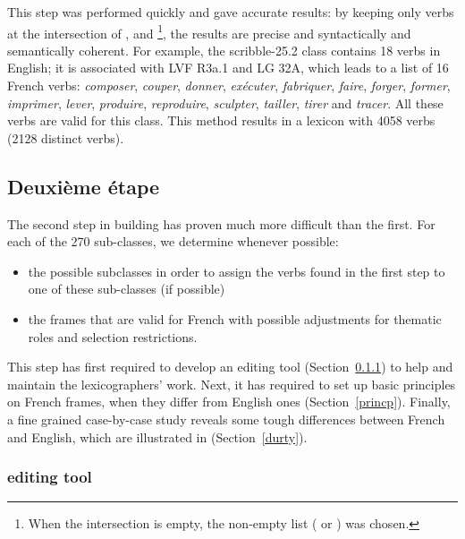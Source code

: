 This step was performed quickly and gave accurate results: by keeping only
verbs at the intersection of \Ltrad{}, \Clvf{} and \Clg{}\footnote{When the
intersection is empty, the non-empty list (\Clvf{} or \Clg{}) was chosen.}, the
results are precise and syntactically and semantically coherent. For example,
the {\color{blue}scribble-25.2} class contains 18 verbs in English; it is
associated with LVF {\color{red}R3a.1} and LG {\color{green}32A},  which leads to a
list of 16 French verbs: \emph{composer}, \emph{couper}, \emph{donner},
\emph{exécuter}, \emph{fabriquer}, \emph{faire}, \emph{forger}, \emph{former},
\emph{imprimer}, \emph{lever}, \emph{produire}, \emph{reproduire},
\emph{sculpter}, \emph{tailler}, \emph{tirer} and \emph{tracer}. All these
verbs are valid for this class.  This method results in a lexicon with 4058
verbs (2128 distinct verbs).



\subsection{Deuxième étape}\label{second}

The second step in building \verbenet{} has proven much more difficult than the
first. For each of the 270 \Cf{} sub-classes, we determine whenever possible:

\begin{itemize}

    \item the possible subclasses in order to assign the verbs found in the
    first step to one of these sub-classes (if possible)

    \item the frames that are valid for French with possible adjustments for
    thematic roles and selection restrictions.

\end{itemize}

This step has first required to develop an editing tool
(Section~\ref{toolquentin}) to help and maintain the lexicographers' work.
Next, it has required to set up basic principles on French frames, when they
differ from English ones (Section~\ref{princp}). Finally, a fine grained
case-by-case study reveals some tough differences between French and English,
which are illustrated in (Section~\ref{durty}).


\subsubsection{\verbenet{} editing tool}\label{toolquentin}

